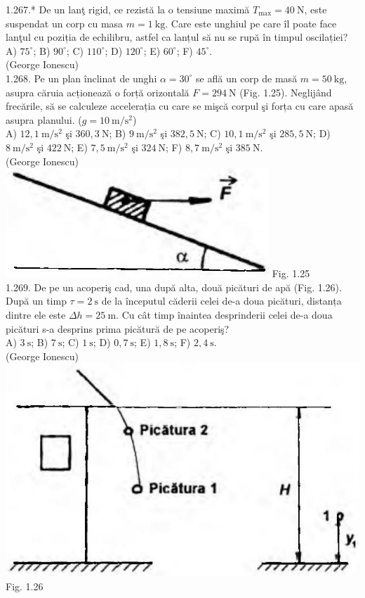 1.267.* De un lanţ rigid, ce rezistă la o tensiune maximă $T_{\max}=40 \mathrm{~N}$, este suspendat un corp cu masa $m=1 \mathrm{~kg}$. Care este unghiul pe care îl poate face lanţul cu poziția de echilibru, astfel ca lanțul să nu se rupă în timpul oscilației?\\ A) $75^{\circ}$; B) $90^{\circ}$; C) $110^{\circ}$; D) $120^{\circ}$; E) $60^{\circ}$; F) $45^{\circ}$.\\ (George Ionescu)\\

1.268. Pe un plan înclinat de unghi $\alpha=30^{\circ}$ se află un corp de masă $m=50 \mathrm{~kg}$, asupra căruia acționează o forță orizontală $F=294 \mathrm{~N}$ (Fig. 1.25). Neglijând frecările, să se calculeze accelerația cu care se mişcă corpul şi forța cu care apasă asupra planului. ($g=10 \mathrm{~m} / \mathrm{s}^{2}$)\\ A) $12,1 \mathrm{~m} / \mathrm{s}^{2}$ şi $360,3 \mathrm{~N}$; B) $9 \mathrm{~m} / \mathrm{s}^{2}$ şi $382,5 \mathrm{~N}$; C) $10,1 \mathrm{~m} / \mathrm{s}^{2}$ şi $285,5 \mathrm{~N}$; D) $8 \mathrm{~m} / \mathrm{s}^{2}$ şi $422 \mathrm{~N}$; E) $7,5 \mathrm{~m} / \mathrm{s}^{2}$ şi $324 \mathrm{~N}$; F) $8,7 \mathrm{~m} / \mathrm{s}^{2}$ şi $385 \mathrm{~N}$.\\ (George Ionescu)\\ \includegraphics[width=0.4\linewidth]{images/2025_07_01_5b3ff9fa0d508c8e9f17g-061(1)} Fig. 1.25\\

1.269. De pe un acoperiş cad, una după alta, două picături de apă (Fig. 1.26). După un timp $\tau=2 \mathrm{~s}$ de la începutul căderii celei de-a doua picături, distanța dintre ele este $\Delta h=25 \mathrm{~m}$. Cu cât timp înaintea desprinderii celei de-a doua picături s-a desprins prima picătură de pe acoperiş?\\ A) $3 \mathrm{~s}$; B) $7 \mathrm{~s}$; C) $1 \mathrm{~s}$; D) $0,7 \mathrm{~s}$; E) $1,8 \mathrm{~s}$; F) $2,4 \mathrm{~s}$.\\ (George Ionescu)\\ \includegraphics[width=0.4\linewidth]{images/2025_07_01_5b3ff9fa0d508c8e9f17g-061(2)} Fig. 1.26\\

